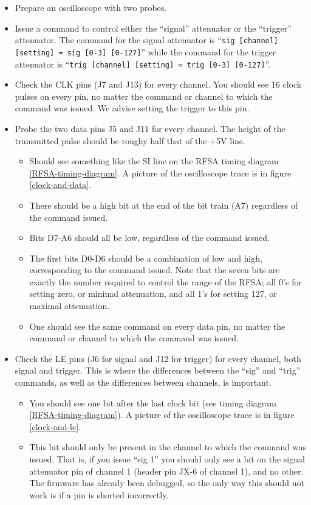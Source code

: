 \documentclass[letter,12pt]{article}
\begin{document}
\begin{itemize}
\item Prepare an oscilloscope with two probes. 
\item Issue a command to control either the ``signal'' attenuator or the ``trigger'' attenuator. The command for the signal attenuator is ``\texttt{sig [channel] [setting] = sig [0-3] [0-127]}'' while the command for the trigger attenuator is ``\texttt{trig [channel] [setting] = trig [0-3] [0-127]}''.
\item Check the CLK pins (J7 and J13) for every channel. You should see 16 clock pulses on every pin, no matter the command or channel to which the command was issued. We advise setting the trigger to this pin.
\item Probe the two data pins J5 and J11 for every channel. The height of the transmitted pulse should be roughy half that of the +5V line.
\begin{itemize}
\item Should see something like the SI line on the RFSA timing diagram \ref{RFSA-timing-diagram}. A picture of the oscilloscope trace is in figure \ref{clock-and-data}.
\item There should be a high bit at the end of the bit train (A7) regardless of the command issued.
\item Bits D7-A6 should all be low, regardless of the command issued.
\item The first bits D0-D6 should be a combination of low and high, corresponding to the command issued. Note that the seven bits are exactly the number required to control the range of the RFSA; all 0's for setting zero, or minimal attenuation, and all 1's for setting 127, or maximal attenuation.
\item One should see the same command on every data pin, no matter the command or channel to which the command was issued.
\end{itemize}
\item Check the LE pins (J6 for signal and J12 for trigger) for every channel, both signal and trigger. This is where the differences between the ``sig'' and ``trig'' commands, as well as the differences between channels, is important.
\begin{itemize}
\item You should see one bit after the last clock bit (see timing diagram
\ref{RFSA-timing-diagram}). A picture of the oscilloscope trace is in figure \ref{clock-and-le}.
\item This bit should only be present in the channel to which the command was issued. That is, if you issue ``sig 1'' you should only see a bit on the signal attenuator pin of channel 1 (header pin JX-6 of channel 1), and no other. The firmware has already been debugged, so the only way this should not work is if a pin is shorted incorrectly.
\end{itemize}
\end{itemize}
\end{document}
